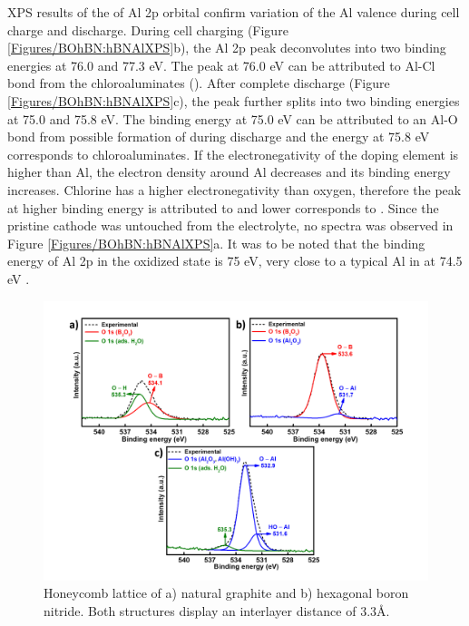 XPS results of the of Al 2p orbital confirm variation of the Al valence during cell charge and discharge. During cell charging (Figure \ref{Figures/BOhBN:hBNAlXPS}b), the Al 2p peak deconvolutes into two binding energies at 76.0 and 77.3 eV. The peak at 76.0 eV can be attributed to Al-Cl bond from the chloroaluminates (). After complete discharge (Figure \ref{Figures/BOhBN:hBNAlXPS}c), the peak further splits into two binding energies at 75.0 and 75.8 eV. The binding energy at 75.0 eV can be attributed to an Al-O bond from possible formation of  during discharge and the energy at 75.8 eV corresponds to chloroaluminates. If the electronegativity of the doping element is higher than Al, the electron density around Al decreases and its binding energy increases. Chlorine has a higher electronegativity than oxygen, therefore the peak at higher binding energy is attributed to  and lower corresponds to . Since the pristine cathode was untouched from the electrolyte, no spectra was observed in Figure \ref{Figures/BOhBN:hBNAlXPS}a. It was to be noted that the binding energy of Al 2p in the oxidized state is 75 eV, very close to a typical Al in  at 74.5 eV \cite{}. 

\begin{figure}[tbh!]
\centering
\includegraphics[width=\textwidth]{Figures/BOhBN/hBNOXPS}
\caption{Honeycomb lattice of a) natural graphite and b) hexagonal boron nitride. Both structures display an interlayer distance of 3.3\AA.}
\label{Figures/BOhBN:hBNOXPS}
\end{figure}

